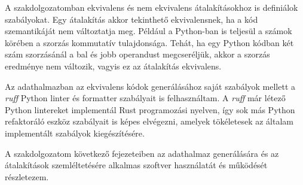 A szakdolgozatomban ekvivalens és nem ekvivalens átalakításokhoz is definiálok szabályokat.
Egy átalakítás akkor tekinthető ekvivalensnek, ha a kód szemantikáját nem változtatja meg.
Például a Python-ban is teljesül a számok körében a szorzás kommutatív tulajdonsága.
Tehát, ha egy Python kódban két szám szorzásánál a bal és jobb operandust megcseréljük,
akkor a szorzás eredménye nem változik, vagyis ez az átalakítás ekvivalens.

Az adathalmazban az ekvivalens kódok generálásához saját szabályok mellett
a \emph{ruff} Python linter és formatter
\cite{Ruff} szabályait is felhasználtam.
A \emph{ruff} már létező Python lintereket implementál Rust programozási nyelven,
így sok más Python refaktoráló eszköz szabályait is képes elvégezni,
amelyek tökéletesek az általam implementált szabályok kiegészítésére.

A szakdolgozatom következő fejezeteiben az adathalmaz generálására és az átalakítások
szemléltetésére alkalmas szoftver használatát és működését részletezem.

